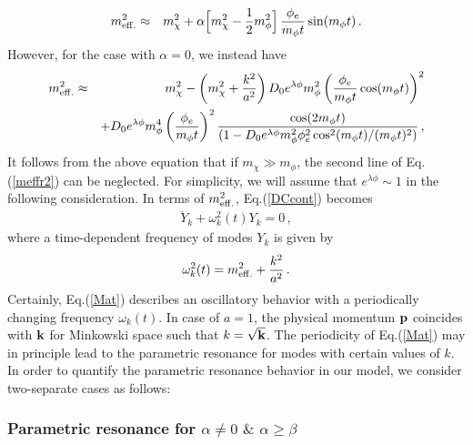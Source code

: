 \documentclass[aps,prd,amsmath,amssymb,preprintnumbers,onecolumn,11pt,nofootinbib]{revtex4}
\begin{document}
\begin{eqnarray}
m^{2}_{\rm eff.} &\approx& m^{2}_{\chi}  + \alpha\Big[m^{2}_{\chi} - \frac{1}{2}m^{2}_{\phi}\Big]\,\frac{\phi_{e}}{m_{\phi}t}\sin(m_{\phi}t)\,.
\label{meffr1}
\end{eqnarray}
However, for the case with $\alpha = 0$, we instead have
\begin{eqnarray}
m^{2}_{\rm eff.} &\approx& m^{2}_{\chi} - \left(m^{2}_{\chi} + \frac{k^{2}}{a^{2}}\right)D_{0}e^{\lambda\phi}m^{2}_{\phi}\left(\frac{\phi_{e}}{m_{\phi}t}\cos(m_{\phi}t)\right)^2
\nonumber\\
&&
+ D_{0} e^{\lambda\phi}m_\phi^4 \left(\frac{\phi_{e}}{m_{\phi}t}\right)^2 
\frac{\cos(2 m_{\phi}t)}
{(1 - D_{0}e^{\lambda\phi}  m^{2}_{\phi}\phi_{e}^2 \cos^{2}(m_{\phi}t) / (m_{\phi}t)^{2})}\,,
\label{meffr2}
\end{eqnarray}
It follows from the above equation that if $m_\chi \gg m_\phi$, the second line of Eq.(\ref{meffr2}) can be neglected. For simplicity, we will assume that $e^{\lambda\phi} \sim 1$ in the following consideration.
In terms of $m^{2}_{\rm eff.}$, Eq.(\ref{DCcont}) becomes
\begin{eqnarray}
\ddot{Y}_{k} + \omega^{2}_{k}(t) Y_{k} = 0\,,
\label{Mat}
\end{eqnarray}
where a time-dependent frequency of modes $Y_{k}$ is given by
\begin{eqnarray}
\omega^{2}_{k}(t) = m^{2}_{\rm eff.} + \frac{k^{2}}{a^{2}}\,.
\label{fre}
\end{eqnarray}
Certainly, Eq.(\ref{Mat}) describes an oscillatory behavior with a periodically changing frequency $\omega_{k}(t)$. In case of $a=1$, the physical momentum ${\bf p}$ coincides with ${\bf k}$ for Minkowski space such that $k=\sqrt{\bf k}$. The periodicity of Eq.(\ref{Mat}) may in principle lead to the parametric resonance for modes
with certain values of $k$. In order to quantify the parametric resonance behavior in our model, we consider two-separate cases as follows:

\subsubsection{{\rm Parametric resonance for} $\alpha\neq 0\,\,\&\,\,\alpha\geq \beta$}
\end{document}
